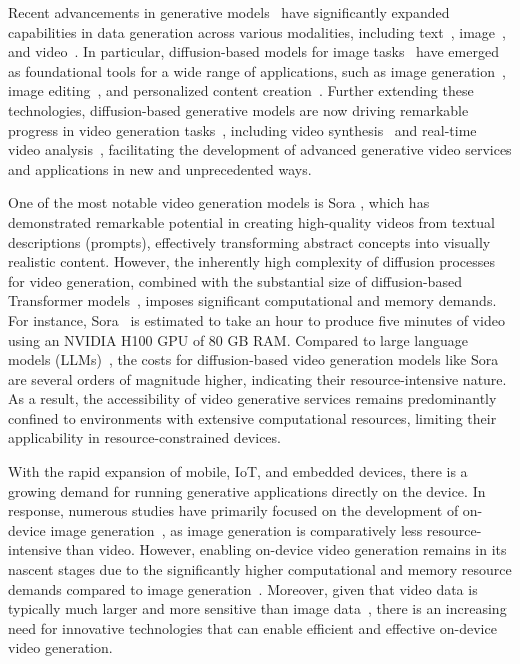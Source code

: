 \iffalse
Recent advancements in generative models~\cite{suzuki2022survey} have significantly expanded capabilities in data generation across various modalities, including text~\cite{hu2017toward}, image~\cite{shaham2019singan}, and video~\cite{unterthiner2018towards}. In particular, diffusion-based models for image tasks~\cite{ho2020denoising, song2020denoising, peebles2023scalable, rombach2022high, saharia2022palette, dhariwal2021diffusion, zhang2023adding, podell2023sdxl} have emerged as foundational tools for a wide range of applications, such as image generation~\cite{ho2022cascaded}, image editing~\cite{kawar2023imagic}, and personalized content creation~\cite{zhang2024survey}. Further extending these technologies, diffusion-based generative models are now driving remarkable progress in video generation tasks~\cite{singer2022make, menapace2024snap, ho2022imagen, ho2022video, blattmann2023stable, molad2023dreamix, harvey2022flexible, blattmann2023align, voleti2022mcvd, wu2023tune, khachatryan2023text2video}, including video synthesis~\cite{liu2021generative} and real-time video analysis~\cite{orriols2004generative}, facilitating the development of advanced generative video services and applications in new and unprecedented ways.

One of the most notable video generation models is Sora \cite{liu2024sora}, which has demonstrated remarkable potential in creating high-quality videos from textual descriptions (prompts), effectively transforming abstract concepts into visually realistic content. However, the inherently high complexity of diffusion processes for video generation, combined with the substantial size of diffusion-based Transformer models~\cite{peebles2023scalable}, imposes significant computational and memory demands. For instance, Sora~\cite{liu2024sora} is estimated to take an hour to produce five minutes of video using an NVIDIA H100 GPU of 80 GB RAM. Compared to large language models (LLMs)~\cite{zhao2023survey}, the costs for diffusion-based video generation models like Sora are several orders of magnitude higher, indicating their resource-intensive nature. As a result, the accessibility of video generative services remains predominantly confined to environments with extensive computational resources, limiting their applicability in resource-constrained devices.

With the rapid expansion of mobile, IoT, and embedded devices, there is a growing demand for running generative applications directly on the device. In response, numerous studies have primarily focused on the development of on-device image generation~\cite{li2024snapfusion, vasu2023mobileone, castells2024edgefusion, choi2023squeezing, chen2023speed, zhao2023mobilediffusion}, as image generation is comparatively less resource-intensive than video. However, enabling on-device video generation remains in its nascent stages due to the significantly higher computational and memory resource demands compared to image generation~\cite{elasri2022image}. Moreover, given that video data is typically much larger and more sensitive than image data~\cite{deng2023efficiency}, there is an increasing need for innovative technologies that can enable efficient and effective on-device video generation.

